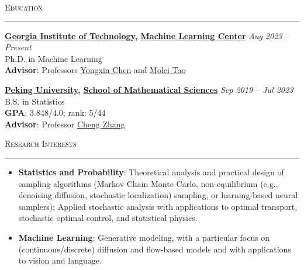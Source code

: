 \documentclass{resume} %
\renewenvironment{rSection}[1]{
\sectionskip
\textcolor{black}{\textsc{#1}}
\sectionlineskip
\hrule
\begin{list}{}{
\setlength{\leftmargin}{1.5em}
}
\item[]
}{
\end{list}
}
\begin{document}
\begin{rSection}{Education}
{\bf \href{https://www.gatech.edu/}{Georgia Institute of Technology}, \href{https://ml.gatech.edu/}{Machine Learning Center}} \hfill {\em Aug 2023 -- Present} 
\\ Ph.D. in Machine Learning\hfill
\\ \textbf{Advisor}: Professors \href{https://yongxin.ae.gatech.edu/}{Yongxin Chen} and \href{https://mtao8.math.gatech.edu/index.html}{Molei Tao}

{\bf \href{https://www.pku.edu.cn/}{Peking University}, \href{https://www.math.pku.edu.cn/}{School of Mathematical Sciences}} \hfill {\em Sep 2019 -- Jul 2023} 
\\ B.S. in Statistics
\\ \textbf{GPA}: 3.848/4.0; rank: 5/44 \hfill
\\ \textbf{Advisor}: Professor \href{https://zcrabbit.github.io/}{Cheng Zhang} 
\end{rSection}

\begin{rSection}{Research Interests}
    \begin{itemize}[leftmargin=0in]
        \item \textbf{Statistics and Probability}: Theoretical analysis and practical design of sampling algorithms (Markov Chain Monte Carlo, non-equilibrium (e.g., denoising diffusion, stochastic localization) sampling, or learning-based neural samplers); Applied stochastic analysis with applications to optimal transport, stochastic optimal control, and statistical physics.
        \item \textbf{Machine Learning}: Generative modeling, with a particular focus on (continuous/discrete) diffusion and flow-based models and with applications to vision and language.
    \end{itemize}
\end{rSection}


\end{document}
